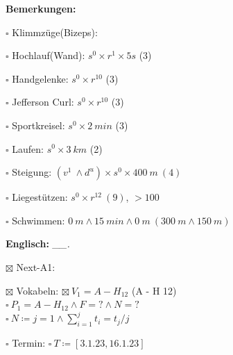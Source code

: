 \documentclass[10pt,a4paper]{article}
\newcommand\mand[1] {{\color {burntorange} {\bf #1}}}          %
\newcommand\topspace{\vskip -15pt \hskip 20pt}
\newcommand\bottomspace{\vskip 4pt}
\newcommand\n[1] { {\sl #1.} \hskip 5pt }
\begin{document}
\begin{mdframed}[style=daystyle]
\begin{labeling}{{\mand {Bemerkungen:}}}
\begin{minipage}{0.75\textwidth}
\begin{labeling}{$\square$ Klimmzüge(Bizeps):}
      \item[$\square$ Hochlauf(Wand):]    $s^0 \times r^{1} \times 5s$ (3)
      \item[$\square$ Handgelenke:]       $s^0 \times r^{10}$ (3)
      \item[$\square$ Jefferson Curl:]    $s^0 \times r^{10}$ (3)
      \item[$\square$ Sportkreisel:]      $s^0 \times 2\ min$ (3)
      \item[$\square$ Laufen:]            $s^0 \times 3\ km$ (2)
      \item[$\square$ Steigung:]          $(v^1 \ \land d^u) \times s^0 \times 400\ m\ (4)$
      \item[$\square$ Liegestützen:]      $s^{0} \times r^{12}\ (9)$, $> 100$
      \item[$\square$ Schwimmen:]         $0\ m \land 15\ min \land 0\ m\ (300\ m \land 150\ m)$
      \end{labeling}
    \end{minipage}
    \bottomspace        

  \item[{\mand {Englisch:}}]      \n{\_\_}
    \topspace
    \begin{minipage}{0.75\textwidth}  
      \begin{labeling}{$\boxtimes$ Next-A1:}
        \setlength\itemsep{-3pt}
      \item[$\boxtimes$ Vokabeln:] $\boxtimes\ V_1 = A - H_{12}$ (A - H 12) \\
        $\square\ P_1 = A - H_{12} \land F = ? \land N = ?$ \\
        $\square\ N \coloneqq j = 1 \land \sum_{i=1} ^{j} t_i = t_j / j$

      \item[$\square$ Termin:] $\square\ T \coloneqq [3.1.23, 16.1.23]$
      \end{labeling}
    \end{minipage}
    \bottomspace


\end{labeling}
\end{mdframed}
\end{document}
